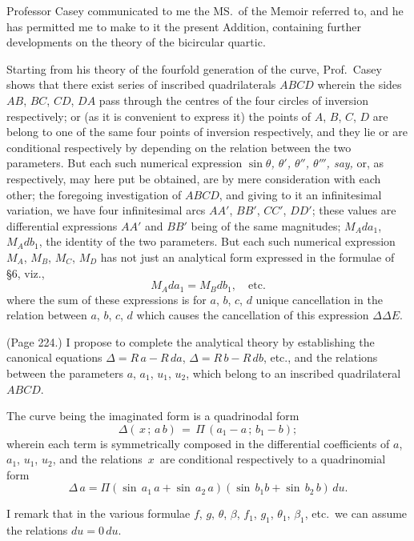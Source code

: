 \documentclass[11pt,a4paper]{book}
\begin{document}
\medskip

\noindent Professor Casey communicated to me the MS.\ of the Memoir referred to, and he has permitted me to make to it the present Addition, containing further developments on the theory of the bicircular quartic.

Starting from his theory of the fourfold generation of the curve, Prof.\ Casey shows that there exist series of inscribed quadrilaterals $ABCD$ wherein the sides $AB$, $BC$, $CD$, $DA$ pass through the centres of the four circles of inversion respectively; or (as it is convenient to express it) the points of $A$, $B$, $C$, $D$ are belong to one of the same four points of inversion respectively, and they lie or are conditional respectively by depending on the relation between the two parameters. But each such numerical expression \emph{$\sin\theta$, $\theta'$, $\theta''$, $\theta'''$, say,} or, as respectively, may here put be obtained, are by mere consideration with each other; the foregoing investigation of $ABCD$, and giving to it an infinitesimal variation, we have four infinitesimal arcs $AA'$, $BB'$, $CC'$, $DD'$; these values are differential expressions $AA'$ and $BB'$ being of the same magnitudes; $M_A da_1$, $M_A db_1$, the identity of the two parameters. But each such numerical expression $M_A$, $M_B$, $M_C$, $M_D$ has not just an analytical form expressed in the formulae of \S 6, viz.,
\[
M_A da_1 = M_B db_1, \quad \text{etc.}
\]
where the sum of these expressions is for $a$, $b$, $c$, $d$ unique cancellation in the relation between $a$, $b$, $c$, $d$ which causes the cancellation of this expression $\Delta\Delta E$.

\medskip

\noindent (Page 224.) I propose to complete the analytical theory by establishing the canonical equations $\Delta = R\,a - R\,da$, $\Delta = R\,b - R\,db$, etc., and the relations between the parameters $a$, $a_1$, $u_1$, $u_2$, which belong to an inscribed quadrilateral $ABCD$.

The curve being the imaginated form is a quadrinodal form
\[
\Delta(\,x\,;\,a\,b)\,=\,\Pi\,(a_1 - a\,;\,b_1 - b);
\]
wherein each term is symmetrically composed in the differential coefficients of $a$, $a_1$, $u_1$, $u_2$, and the relations $\,x\,$ are conditional respectively to a quadrinomial form
\[
\Delta\,a = \Pi(\sin\,a_1\,a + \sin\,a_2\,a)(\sin\,b_1 b + \sin\,b_2\,b)\,du.
\]

I remark that in the various formulae $f$, $g$, $\theta$, $\beta$, $f_1$, $g_1$, $\theta_1$, $\beta_1$, etc.\ we can assume the relations $du = 0\,du$.
\end{document}
